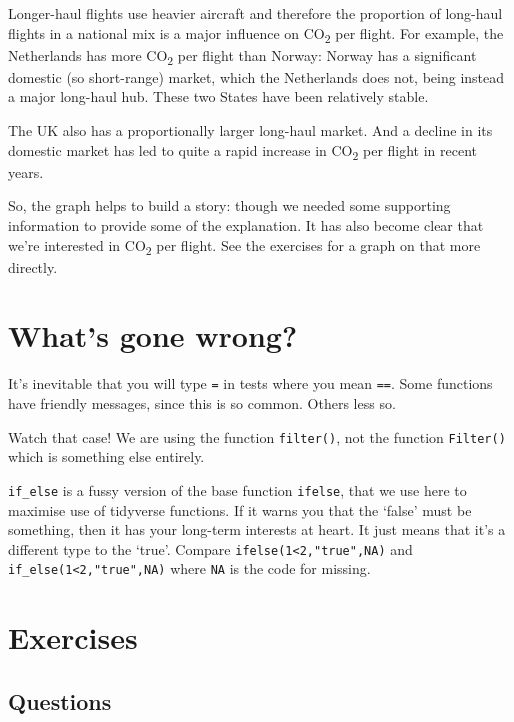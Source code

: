 \documentclass[
]{book}
\begin{document}
Longer-haul flights use heavier aircraft and therefore the proportion of long-haul flights in a national mix is a major influence on CO\textsubscript{2} per flight. For example, the Netherlands has more CO\textsubscript{2} per flight than Norway: Norway has a significant domestic (so short-range) market, which the Netherlands does not, being instead a major long-haul hub. These two States have been relatively stable.

The UK also has a proportionally larger long-haul market. And a decline in its domestic market has led to quite a rapid increase in CO\textsubscript{2} per flight in recent years.

So, the graph helps to build a story: though we needed some supporting information to provide some of the explanation. It has also become clear that we're interested in CO\textsubscript{2} per flight. See the exercises for a graph on that more directly.

\hypertarget{whats-gone-wrong-3}{%
\section{What's gone wrong?}\label{whats-gone-wrong-3}}

It's inevitable that you will type \texttt{=} in tests where you mean \texttt{==}. Some functions have friendly messages, since this is so common. Others less so.

Watch that case! We are using the function \texttt{filter()}, not the function \texttt{Filter()} which is something else entirely.

\texttt{if\_else} is a fussy version of the base function \texttt{ifelse}, that we use here to maximise use of tidyverse functions. If it warns you that the `false' must be something, then it has your long-term interests at heart. It just means that it's a different type to the `true'. Compare \texttt{ifelse(1\textless{}2,"true",NA)} and \texttt{if\_else(1\textless{}2,"true",NA)} where \texttt{NA} is the code for missing.

\hypertarget{exercises}{%
\section{Exercises}\label{exercises}}

\hypertarget{questions-2}{%
\subsection{Questions}\label{questions-2}}
\end{document}
